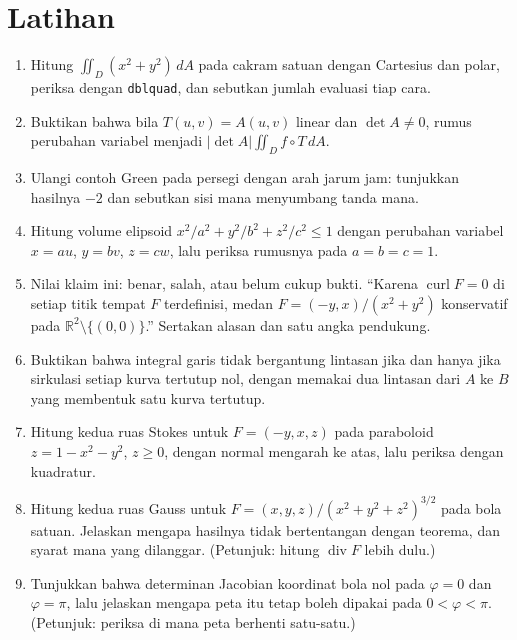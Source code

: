 \section{Latihan}
\begin{latihan}
\begin{enumerate}
\item Hitung $\iint_{D}(x^{2}+y^{2})\,dA$ pada cakram satuan dengan Cartesius dan polar, periksa dengan \texttt{dblquad}, dan sebutkan jumlah evaluasi tiap cara.

\item Buktikan bahwa bila $T(u,v)=A(u,v)$ linear dan $\det A\ne0$, rumus
perubahan variabel menjadi $|\det A|\iint_{D}f\circ T\,dA$.

\item Ulangi contoh Green pada persegi dengan arah jarum jam: tunjukkan hasilnya
$-2$ dan sebutkan sisi mana menyumbang tanda mana.

\item Hitung volume elipsoid $x^{2}/a^{2}+y^{2}/b^{2}+z^{2}/c^{2}\le1$ dengan
perubahan variabel $x=au$, $y=bv$, $z=cw$, lalu periksa rumusnya pada
$a=b=c=1$.

\item Nilai klaim ini: benar, salah, atau belum cukup bukti. ``Karena
$\operatorname{curl}F=0$ di setiap titik tempat $F$ terdefinisi, medan
$F=(-y,x)/(x^{2}+y^{2})$ konservatif pada
$\mathbb{R}^{2}\setminus\{(0,0)\}$.'' Sertakan alasan dan satu angka
pendukung.

\item Buktikan bahwa integral garis tidak bergantung lintasan jika dan hanya jika
sirkulasi setiap kurva tertutup nol, dengan memakai dua lintasan dari $A$ ke
$B$ yang membentuk satu kurva tertutup.

\item Hitung kedua ruas Stokes untuk $F=(-y,x,z)$ pada paraboloid
$z=1-x^{2}-y^{2}$, $z\ge0$, dengan normal mengarah ke atas, lalu periksa
dengan kuadratur.

\item Hitung kedua ruas Gauss untuk $F=(x,y,z)/(x^{2}+y^{2}+z^{2})^{3/2}$ pada bola
satuan. Jelaskan mengapa hasilnya tidak bertentangan dengan teorema, dan
syarat mana yang dilanggar. (Petunjuk: hitung $\operatorname{div}F$ lebih dulu.)

\item Tunjukkan bahwa determinan Jacobian koordinat bola nol pada $\varphi=0$ dan
$\varphi=\pi$, lalu jelaskan mengapa peta itu tetap boleh dipakai pada
$0<\varphi<\pi$. (Petunjuk: periksa di mana peta berhenti satu-satu.)
\end{enumerate}
\end{latihan}


